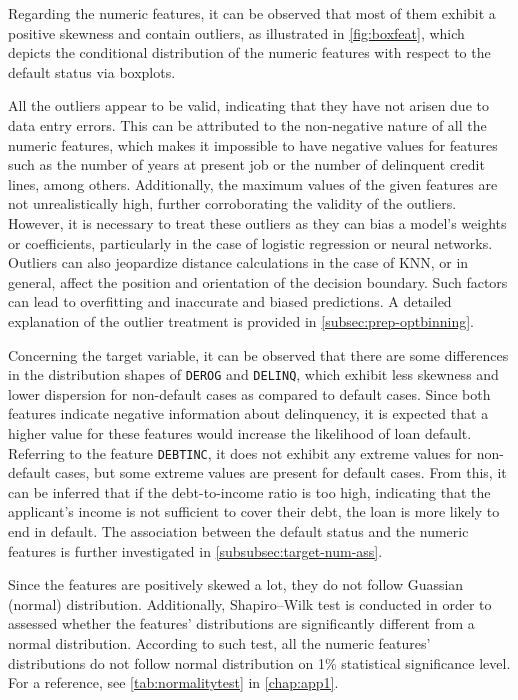Regarding the numeric features, it can be observed that most of them exhibit a positive skewness and contain outliers, as illustrated in \autoref{fig:boxfeat}, which depicts the conditional distribution of the numeric features with respect to the default status via boxplots.

All the outliers appear to be valid, indicating that they have not arisen due to data entry errors.
This can be attributed to the non-negative nature of all the numeric features, which makes it impossible to have negative values for features such as the number of years at present job or the number of delinquent credit lines, among others.
Additionally, the maximum values of the given features are not unrealistically high, further corroborating the validity of the outliers.
However, it is necessary to treat these outliers as they can bias a model's weights or coefficients, particularly in the case of logistic regression or neural networks.
Outliers can also jeopardize distance calculations in the case of KNN, or in general, affect the position and orientation of the decision boundary.
Such factors can lead to overfitting and inaccurate and biased predictions.
A detailed explanation of the outlier treatment is provided in \autoref{subsec:prep-optbinning}.

Concerning the target variable, it can be observed that there are some differences in the distribution shapes of \texttt{DEROG} and \texttt{DELINQ}, which exhibit less skewness and lower dispersion for non-default cases as compared to default cases.
Since both features indicate negative information about delinquency, it is expected that a higher value for these features would increase the likelihood of loan default.
Referring to the feature \texttt{DEBTINC}, it does not exhibit any extreme values for non-default cases, but some extreme values are present for default cases.
From this, it can be inferred that if the debt-to-income ratio is too high, indicating that the applicant's income is not sufficient to cover their debt, the loan is more likely to end in default.
The association between the default status and the numeric features is further investigated in \autoref{subsubsec:target-num-ass}.

Since the features are positively skewed a lot, they do not follow Guassian (normal) distribution. Additionally, Shapiro--Wilk test is conducted in order to assessed whether the features' distributions are significantly different from a normal distribution.
According to such test, all the numeric features' distributions do not follow normal distribution on 1\% statistical significance level.
For a reference, see \autoref{tab:normalitytest} in \autoref{chap:app1}.


